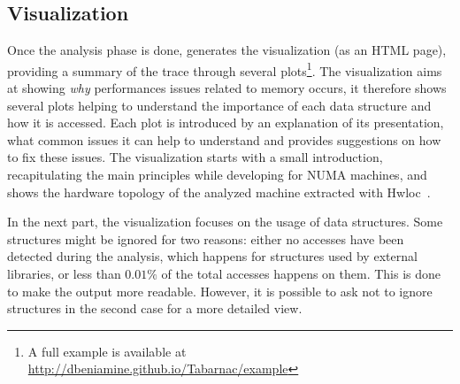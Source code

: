 



\subsection{Visualization}
\label{sec:design-visu}


Once the analysis phase is done,
\TABARNAC generates the visualization (as an HTML page), providing a summary
of the trace through several plots\footnote{A full example is available at
    \url{http://dbeniamine.github.io/Tabarnac/example}}.
The visualization aims at showing \emph{why} performances issues related
to memory occurs, it therefore shows several plots helping to understand the
importance of each data structure and how it is accessed.
Each plot is introduced by an explanation
of its presentation, what common issues it can help to understand and provides
suggestions on how to fix these issues.  The visualization starts with a small
introduction, recapitulating the main principles while developing for NUMA
machines, and shows the hardware topology of the analyzed machine extracted
with Hwloc~\cite{Broquedis10hwloc}.

In the next part, the visualization focuses on the usage of data structures. Some
structures might be ignored for two reasons: either no accesses have been
detected during the analysis, which happens for structures used by external
libraries, or less than $0.01\%$ of the total accesses happens on them. This is
done to make the output more readable. However, it is possible to ask
\TABARNAC not to ignore structures in the second case for a more detailed view.

